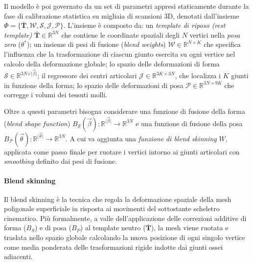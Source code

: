 Il modello è poi governato da un set di parametri appresi staticamente durante la fase di calibrazione statistica su migliaia di scansioni 3D, denotati dall'insieme $\Phi = \{\bar{\mathbf{T}}, \mathcal{W}, \mathcal{S}, \mathcal{J}, \mathcal{P}\}$.
%
L'insieme è composto da:
un \emph{template di riposo (rest template)} $\bar{\mathbf{T}} \in \mathbb{R}^{3N}$ che contiene le coordinate spaziali degli $N$ vertici nella \emph{posa zero} ($\theta^{*}$);
un insieme di pesi di fusione (\emph{blend weights}) $\mathcal{W} \in \mathbb{R}^{N \times K}$ che specifica l'influenza che la trasformazione di ciascun giunto esercita su ogni vertice nel calcolo della deformazione globale;
lo spazio delle deformazioni di forma $\mathcal{S} \in \mathbb{R}^{3N \times \vert \vec{\beta} \vert}$;
il regressore dei centri articolari $\mathcal{J} \in \mathbb{R}^{3K \times 3N}$, che localizza i $K$ giunti in funzione della forma;
lo spazio delle deformazioni di posa $\mathcal{P} \in \mathbb{R}^{3N \times 9K}$ che corregge i volumi dei tessuti molli.

Oltre a questi parametri bisogna considerare una funzione di fusione della forma (\emph{blend shape function}) $B_{\mathcal{S}}(\vec{\beta}): \mathbb{R}^{\vert \vec{\beta} \vert} \to \mathbb{R}^{3N}$ e una funzione di fusione della posa $B_{\mathcal{P}}(\vec{\theta}): \mathbb{R}^{\vert \vec{\theta} \vert} \to \mathbb{R}^{3N}$.
A cui va aggiunta una \emph{funzione di blend skinning} $W$, applicata come passo finale per ruotare i vertici intorno ai giunti articolari con \emph{smoothing} definito dai pesi di fusione.


\paragraph{Blend skinning}

Il blend skinning è la tecnica che regola la deformazione spaziale della mesh poligonale superficiale in risposta ai movimenti del sottostante scheletro cinematico.
Più formalmente, a valle dell'applicazione delle correzioni additive di forma ($B_S$) e di posa ($B_P$) al template neutro ($\bar{\mathbf{T}}$), la mesh viene ruotata e traslata nello spazio globale calcolando la nuova posizione di ogni singolo vertice come media ponderata delle trasformazioni rigide indotte dai giunti ossei adiacenti.

